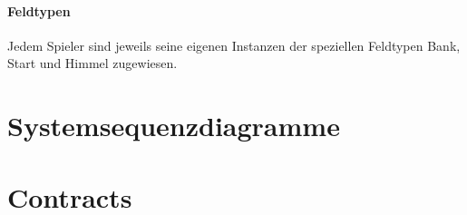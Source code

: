 \documentclass[a4paper,12pt,halfparskip,DIV14]{scrartcl}
\begin{document}
\paragraph{Feldtypen}\label{ssub:feldtypen} %
Jedem Spieler sind jeweils seine eigenen Instanzen der speziellen Feldtypen Bank, Start und Himmel zugewiesen.

\section{Systemsequenzdiagramme}\label{cha:systemsequenzdiagramme} %


\section{Contracts}\label{cha:contracts} %

\end{document}
